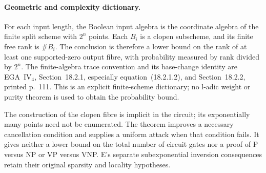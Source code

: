 \paragraph{Geometric and complexity dictionary.}
For each input length, the Boolean input algebra is the coordinate
algebra of the finite split scheme with $2^n$ points. Each $B_i$ is a
clopen subscheme, and its finite free rank is $\#B_i$.
The conclusion is therefore a lower bound on the rank of at least one
supported-zero output fibre, with probability measured by rank divided
by $2^n$. The finite-algebra trace convention and its base-change
identity are EGA~IV$_4$, Section~18.2.1, especially equation~(18.2.1.2),
and Section~18.2.2, printed p.~111. This is an explicit finite-scheme
dictionary; no l-adic weight or purity theorem is used to obtain the
probability bound.

The construction of the clopen fibre is implicit in the circuit;
its exponentially many points need not be enumerated. The theorem
improves a necessary cancellation condition and supplies a uniform
attack when that condition fails. It gives neither a lower bound on
the total number of circuit gates nor a proof of P versus NP or
VP versus VNP. E's separate subexponential inversion consequences
retain their original sparsity and locality hypotheses.
